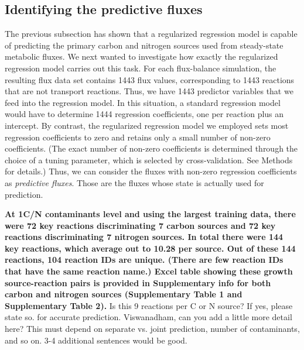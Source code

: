 \documentclass[12pt]{article}
\begin{document}
\subsection*{Identifying the predictive fluxes}

The previous subsection has shown that a regularized regression model is capable of predicting the primary carbon and nitrogen sources used from steady-state metabolic fluxes. We next wanted to investigate how exactly the regularized regression model carries out this task. For each flux-balance simulation, the resulting flux data set contains 1443 flux values, corresponding to 1443 reactions that are not transport reactions. Thus, we have 1443 predictor variables that we feed into the regression model. In this situation, a standard regression model would have to determine 1444 regression coefficients, one per reaction plus an intercept. By contrast, the regularized regression model we employed sets most regression coefficients to zero and retains only a small number of non-zero coefficients. (The exact number of non-zero coefficients is determined through the choice of a tuning parameter, which is selected by cross-validation. See Methods for details.) Thus, we can consider the fluxes with non-zero regression coefficients as \emph{predictive fluxes}. Those are the fluxes whose state is actually used for prediction.

\textbf{At 1C/N contaminants level and using the largest training data, there were 72 key reactions discriminating 7 carbon sources and 72 key reactions discriminating 7 nitrogen sources. In total there were 144 key reactions, which average out to 10.28 per source. Out of these 144 reactions, 104 reaction IDs are unique. (There are few reaction IDs that have the same reaction name.) Excel table showing these growth source-reaction pairs is provided in Supplementary info for both carbon and nitrogen sources (Supplementary Table 1 and Supplementary Table 2). } {\color{red}Is this 9 reactions per C or N source? If yes, please state so.} for accurate prediction. {\color{red}Viswanadham, can you add a little more detail here? This must depend on separate vs. joint prediction, number of contaminants, and so on. 3-4 additional sentences would be good.}
\end{document}

